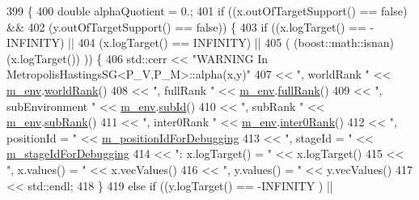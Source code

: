 \begin{DoxyCode}
399 \{
400   \textcolor{keywordtype}{double} alphaQuotient = 0.;
401   \textcolor{keywordflow}{if} ((x.outOfTargetSupport() == \textcolor{keyword}{false}) &&
402       (y.outOfTargetSupport() == \textcolor{keyword}{false})) \{
403     \textcolor{keywordflow}{if} ((x.logTarget() == -INFINITY) ||
404         (x.logTarget() ==  INFINITY) ||
405         ( (boost::math::isnan)(x.logTarget())      )) \{
406       std::cerr << \textcolor{stringliteral}{"WARNING In MetropolisHastingsSG<P\_V,P\_M>::alpha(x,y)"}
407                 << \textcolor{stringliteral}{", worldRank "}       << \hyperlink{class_q_u_e_s_o_1_1_metropolis_hastings_s_g_ac8ea061e55b920e0c8f9bce5c3f20e52}{m\_env}.\hyperlink{class_q_u_e_s_o_1_1_base_environment_a78b57112bbd0e6dd0e8afec00b40ffa7}{worldRank}()
408                 << \textcolor{stringliteral}{", fullRank "}        << \hyperlink{class_q_u_e_s_o_1_1_metropolis_hastings_s_g_ac8ea061e55b920e0c8f9bce5c3f20e52}{m\_env}.\hyperlink{class_q_u_e_s_o_1_1_base_environment_a84a239e42ae443cf71db6e03e8159620}{fullRank}()
409                 << \textcolor{stringliteral}{", subEnvironment "}  << \hyperlink{class_q_u_e_s_o_1_1_metropolis_hastings_s_g_ac8ea061e55b920e0c8f9bce5c3f20e52}{m\_env}.\hyperlink{class_q_u_e_s_o_1_1_base_environment_a6ae3174897a9b3a4c85fa18da5d4c16f}{subId}()
410                 << \textcolor{stringliteral}{", subRank "}         << \hyperlink{class_q_u_e_s_o_1_1_metropolis_hastings_s_g_ac8ea061e55b920e0c8f9bce5c3f20e52}{m\_env}.\hyperlink{class_q_u_e_s_o_1_1_base_environment_a172d52f993f1322ed45aaddf71518dbb}{subRank}()
411                 << \textcolor{stringliteral}{", inter0Rank "}      << \hyperlink{class_q_u_e_s_o_1_1_metropolis_hastings_s_g_ac8ea061e55b920e0c8f9bce5c3f20e52}{m\_env}.\hyperlink{class_q_u_e_s_o_1_1_base_environment_ae106b5bb8a80b655b88b3a26b1e7c185}{inter0Rank}()
412                 << \textcolor{stringliteral}{", positionId = "}    << \hyperlink{class_q_u_e_s_o_1_1_metropolis_hastings_s_g_a49500f5107190c94813e232cd806c2bc}{m\_positionIdForDebugging}
413                 << \textcolor{stringliteral}{", stageId = "}       << \hyperlink{class_q_u_e_s_o_1_1_metropolis_hastings_s_g_aca9351ab468808759b8b19686231ae4f}{m\_stageIdForDebugging}
414                 << \textcolor{stringliteral}{": x.logTarget() = "} << x.logTarget()
415                 << \textcolor{stringliteral}{", x.values() = "}    << x.vecValues()
416                 << \textcolor{stringliteral}{", y.values() = "}    << y.vecValues()
417                 << std::endl;
418     \}
419     \textcolor{keywordflow}{else} \textcolor{keywordflow}{if} ((y.logTarget() == -INFINITY           ) ||

\end{DoxyCode}

